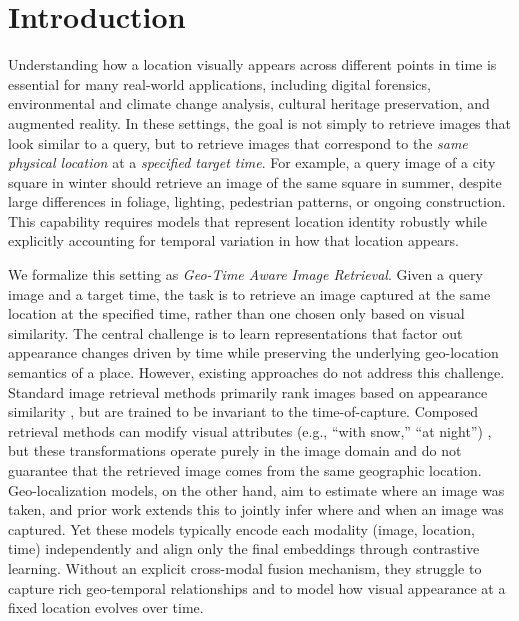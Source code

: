 
\section{Introduction}

Understanding how a location visually appears across different points in time is essential for many real-world applications, including digital forensics, environmental and climate change analysis, cultural heritage preservation, and augmented reality. In these settings, the goal is not simply to retrieve images that look similar to a query, but to retrieve images that correspond to the \emph{same physical location} at a \emph{specified target time}. For example, a query image of a city square in winter should retrieve an image of the same square in summer, despite large differences in foliage, lighting, pedestrian patterns, or ongoing construction. This capability requires models that represent location identity robustly while explicitly accounting for temporal variation in how that location appears.

We formalize this setting as \emph{Geo-Time Aware Image Retrieval}. Given a query image and a target time, the task is to retrieve an image captured at the same location at the specified time, rather than one chosen only based on visual similarity. The central challenge is to learn representations that factor out appearance changes driven by time while preserving the underlying geo-location semantics of a place. 
However, existing approaches do not address this challenge. Standard image retrieval methods primarily rank images based on appearance similarity \cite{zhu2023r2former, keetha2023anyloc, Berton_2025_CVPR}, but are trained to be invariant to the time-of-capture. Composed retrieval methods can modify visual attributes (e.g., “with snow,” “at night”) \cite{saito2023pic2word, baldrati2023zero}, but these transformations operate purely in the image domain and do not guarantee that the retrieved image comes from the same geographic location. Geo-localization models, on the other hand, aim to estimate where an image was taken, and prior work \cite{zhai2019learning, Shatwell_2025_ICCV} extends this to jointly infer where and when an image was captured. Yet these models typically encode each modality (image, location, time) independently and align only the final embeddings through contrastive learning. Without an explicit cross-modal fusion mechanism, they struggle to capture rich geo-temporal relationships and to model how visual appearance at a fixed location evolves over time.

